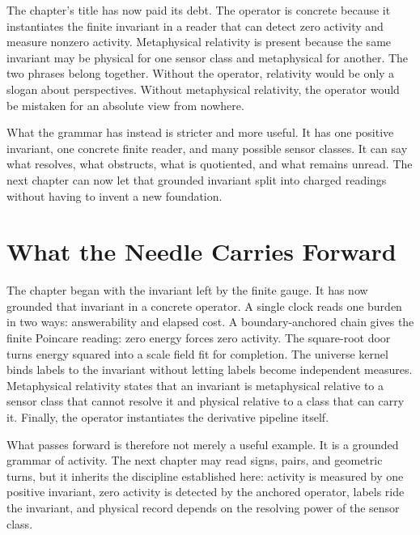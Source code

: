 The chapter's title has now paid its debt. The operator is concrete because
it instantiates the finite invariant in a reader that can detect zero
activity and measure nonzero activity. Metaphysical relativity is present
because the same invariant may be physical for one sensor class and
metaphysical for another. The two phrases belong together. Without the
operator, relativity would be only a slogan about perspectives. Without
metaphysical relativity, the operator would be mistaken for an absolute
view from nowhere.

What the grammar has instead is stricter and more useful. It has one
positive invariant, one concrete finite reader, and many possible sensor
classes. It can say what resolves, what obstructs, what is quotiented, and
what remains unread. The next chapter can now let that grounded invariant
split into charged readings without having to invent a new foundation.

\section{What the Needle Carries Forward}

The chapter began with the invariant left by the finite gauge. It has now
grounded that invariant in a concrete operator. A single clock reads one
burden in two ways: answerability and elapsed cost. A boundary-anchored
chain gives the finite Poincare reading: zero energy forces zero activity.
The square-root door turns energy squared into a scale field fit for
completion. The universe kernel binds labels to the invariant without
letting labels become independent measures. Metaphysical relativity states
that an invariant is metaphysical relative to a sensor class that cannot
resolve it and physical relative to a class that can carry it. Finally, the
operator instantiates the derivative pipeline itself.

What passes forward is therefore not merely a useful example. It is a
grounded grammar of activity. The next chapter may read signs, pairs, and
geometric turns, but it inherits the discipline established here: activity
is measured by one positive invariant, zero activity is detected by the
anchored operator, labels ride the invariant, and physical record depends on
the resolving power of the sensor class.
